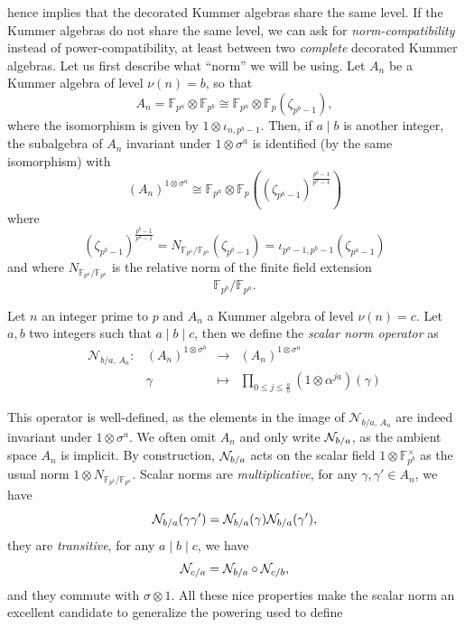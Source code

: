 hence implies that the decorated Kummer algebras share the same level. If the
Kummer algebras do not share the same level, we can ask for
\emph{norm-compatibility} instead of power-compatibility, at least between two
\emph{complete} decorated Kummer algebras. 
Let us first describe what ``norm'' we will be using.
Let $A_n$ be a Kummer algebra of level $\nu(n) = b$, so that
\[
  A_n = \mathbb{F}_{p^{n}}\otimes\mathbb{F}_{p^{b}}\cong
  \mathbb{F}_{p^{n}}\otimes\mathbb{F}_{p}(\zeta_{p^b-1}),
\]
where the isomorphism is given by $1\otimes\iota_{n, p^b-1}$. Then, if $a\mid b$
is another integer, the subalgebra of $A_n$ invariant under $1\otimes\sigma^a$
is identified (by the same isomorphism) with
\[
  (A_n)^{1\otimes\sigma^a} \cong \mathbb{F}_{p^{n}}\otimes\mathbb{F}_p(
  (\zeta_{p^b-1})^{\frac{p^b-1}{p^a-1}})
\]
where
\[
  (\zeta_{p^b-1})^{\frac{p^b-1}{p^a-1}} =
  N_{\mathbb{F}_{p^{n}}/\mathbb{F}_{p^{a}}}(\zeta_{p^b-1}) = \iota_{p^a-1,
  p^b-1}(\zeta_{p^a-1})
\]
and where $N_{\mathbb{F}_{p^{n}}/\mathbb{F}_{p^{a}}}$ is the relative norm of
the finite field extension
\[
  \mathbb{F}_{p^{b}}/\mathbb{F}_{p^{a}}.
\]
\begin{defi}
  Let $n$ an integer prime to $p$ and $A_n$ a Kummer algebra of level
  $\nu(n)=c$. Let $a,b$ two integers such that $a\mid b \mid c$,
  then we define the \emph{scalar norm operator} as
  \[
    \begin{array}{cccc}
      \mathcal N_{b/a,\, A_n}: & (A_n)^{1\otimes\sigma^b} & \to &
      (A_n)^{1\otimes\sigma^a}\\
      & \gamma & \mapsto & \prod_{0\leq j\leq
        \frac{a}{b}}(1\otimes\alpha^{ja})(\gamma)
    \end{array}
  \]
\end{defi}
This operator is well-defined, as the elements in the image of $\mathcal
N_{b/a,\, A_n}$ are indeed invariant under $1\otimes\sigma^a$. We often 
omit $A_n$ and only write $\mathcal{N}_{b/a}$, as the ambient space $A_n$ is
implicit. By construction, $\mathcal{N}_{b/a}$ acts on the scalar field
$1\otimes\mathbb{F}_{p^b}^\times$ as the usual norm $1\otimes
N_{\mathbb{F}_{p^{b}}/\mathbb{F}_{p^{a}}}$. Scalar norms are
\emph{multiplicative}, \ie for any $\gamma, \gamma'\in A_n$, we have
\[
  \mathcal{N}_{b/a}(\gamma\gamma') = \mathcal{N}_{b/a}(\gamma)\mathcal{N}_{b/a}(\gamma'),
\]
they are \emph{transitive}, \ie for any $a\mid b\mid c$, we have
\[
  \mathcal{N}_{c/a} = \mathcal{N}_{b/a}\circ\mathcal{N}_{c/b},
\]
and they commute with $\sigma\otimes1$. All these nice properties make the
scalar norm an excellent candidate to generalize the powering used to define
